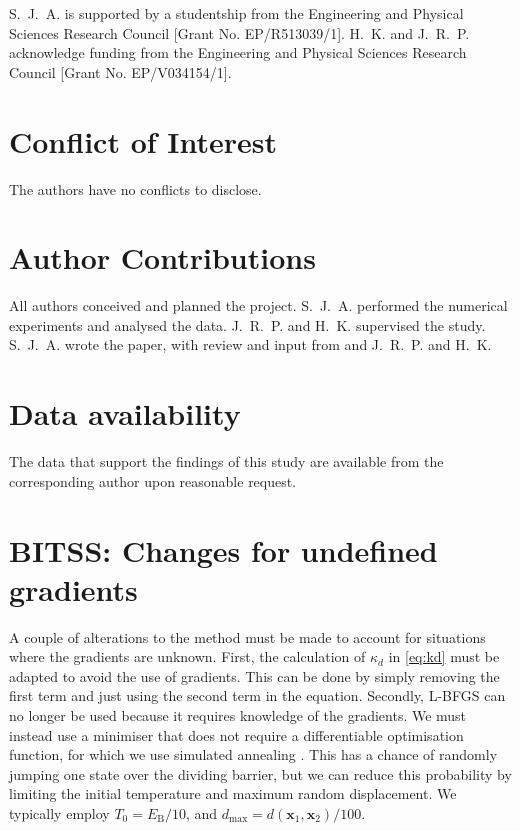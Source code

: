 \documentclass[aip,jcp,reprint,twocolumn]{revtex4-1}
\begin{document}
\begin{acknowledgments}
  S.~J.~A. is supported by a studentship from the Engineering and Physical Sciences Research Council [Grant No. EP/R513039/1].
  H.~K. and J.~R.~P. acknowledge funding from the Engineering and Physical Sciences Research Council [Grant No. EP/V034154/1].
\end{acknowledgments}

\section*{Conflict of Interest}
The authors have no conflicts to disclose.

\section*{Author Contributions}
All authors conceived and planned the project.
S.~J.~A. performed the numerical experiments and analysed the data.
J.~R.~P. and H.~K. supervised the study.
S.~J.~A. wrote the paper, with review and input from and J.~R.~P. and H.~K.

\section*{Data availability}
The data that support the findings of this study are available from the corresponding author upon reasonable request.


\appendix
\section{BITSS: Changes for undefined gradients}
A couple of alterations to the method must be made to account for situations where the gradients are unknown.
First, the calculation of $\kappa_d$ in \cref{eq:kd} must be adapted to avoid the use of gradients.
This can be done by simply removing the first term and just using the second term in the equation.
Secondly, L-BFGS can no longer be used because it requires knowledge of the gradients.
We must instead use a minimiser that does not require a differentiable optimisation function, for which we use simulated annealing \cite{Kirkpatrick1983}.
This has a chance of randomly jumping one state over the dividing barrier, but we can reduce this probability by limiting the initial temperature and maximum random displacement.
We typically employ $T_0 = E_\mathrm{B} / 10$, and $d_\mathrm{max} = d(\bm{x}_1, \bm{x}_2) / 100$.
\end{document}
